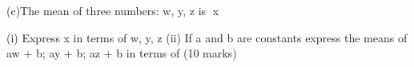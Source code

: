 (c)The mean of three numbers: w, y, z is x

(i) Express x in terms of w, y, z
(ii)  If a and b are constants express the means of 
aw + b;   ay + b;   az + b
in terms of  
(10 marks)



%
%



